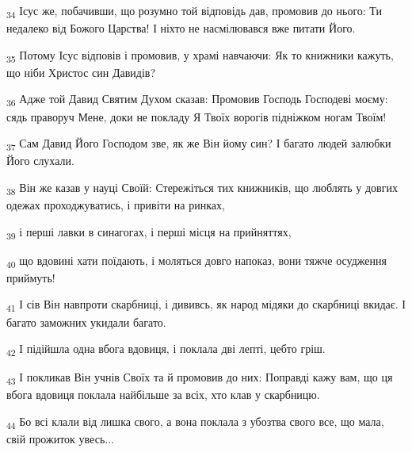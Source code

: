 \begin{tcolorbox}
\textsubscript{34} Ісус же, побачивши, що розумно той відповідь дав, промовив до нього: Ти недалеко від Божого Царства! І ніхто не насмілювався вже питати Його.
\end{tcolorbox}
\begin{tcolorbox}
\textsubscript{35} Потому Ісус відповів і промовив, у храмі навчаючи: Як то книжники кажуть, що ніби Христос син Давидів?
\end{tcolorbox}
\begin{tcolorbox}
\textsubscript{36} Адже той Давид Святим Духом сказав: Промовив Господь Господеві моєму: сядь праворуч Мене, доки не покладу Я Твоїх ворогів підніжком ногам Твоїм!
\end{tcolorbox}
\begin{tcolorbox}
\textsubscript{37} Сам Давид Його Господом зве, як же Він йому син? І багато людей залюбки Його слухали.
\end{tcolorbox}
\begin{tcolorbox}
\textsubscript{38} Він же казав у науці Своїй: Стережіться тих книжників, що люблять у довгих одежах проходжуватись, і привіти на ринках,
\end{tcolorbox}
\begin{tcolorbox}
\textsubscript{39} і перші лавки в синагогах, і перші місця на прийняттях,
\end{tcolorbox}
\begin{tcolorbox}
\textsubscript{40} що вдовині хати поїдають, і моляться довго напоказ, вони тяжче осудження приймуть!
\end{tcolorbox}
\begin{tcolorbox}
\textsubscript{41} І сів Він навпроти скарбниці, і дививсь, як народ мідяки до скарбниці вкидає. І багато заможних укидали багато.
\end{tcolorbox}
\begin{tcolorbox}
\textsubscript{42} І підійшла одна вбога вдовиця, і поклала дві лепті, цебто гріш.
\end{tcolorbox}
\begin{tcolorbox}
\textsubscript{43} І покликав Він учнів Своїх та й промовив до них: Поправді кажу вам, що ця вбога вдовиця поклала найбільше за всіх, хто клав у скарбницю.
\end{tcolorbox}
\begin{tcolorbox}
\textsubscript{44} Бо всі клали від лишка свого, а вона поклала з убозтва свого все, що мала, свій прожиток увесь...
\end{tcolorbox}
